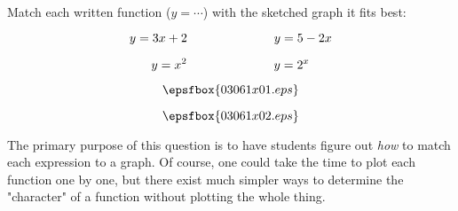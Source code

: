 

Match each written function ($y = \cdots$) with the sketched graph it fits best:

$$y = 3x + 2 \hbox{\hskip 70pt} y = 5 - 2x$$

$$y = x^2 \hbox{\hskip 70pt} y = 2^x$$

$$\epsfbox{03061x01.eps}$$







$$\epsfbox{03061x02.eps}$$







The primary purpose of this question is to have students figure out {\it how} to match each expression to a graph.  Of course, one could take the time to plot each function one by one, but there exist much simpler ways to determine the "character" of a function without plotting the whole thing.




